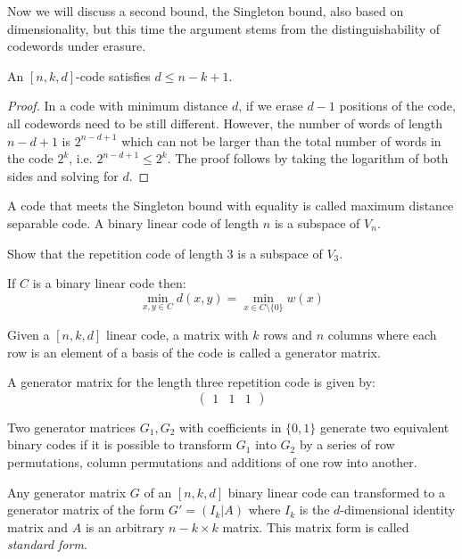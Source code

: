 Now we will discuss a second bound, the Singleton bound, also based on dimensionality, but this time the argument stems from the distinguishability of codewords under erasure.
\begin{theorem}
An $[n,k,d]$-code satisfies $d\leq n-k+1$.
\end{theorem}
\begin{proof}
In a code with minimum distance $d$, if we erase $d-1$ positions of the code, all codewords need to be still different. However, the number of words of length $n-d+1$ is $2^{n-d+1}$ which can not be larger than the total number of words in the code $2^k$, i.e. $2^{n-d+1}\leq2^k$. The proof follows by taking the logarithm of both sides and solving for $d$.
\end{proof}
A code that meets the Singleton bound with equality is called maximum distance separable code.
A binary linear code of length $n$ is a subspace of $V_n$.
\begin{exercise}
Show that the repetition code of length 3 is a subspace of $V_3$.
\end{exercise}
\begin{exercise}
If $C$ is a binary linear code then:
\begin{equation}
\min_{x,y\in C}d(x,y)=\min_{x\in C\setminus\{0\}}w(x)
\end{equation}
\end{exercise}
\begin{definition}
Given a $[n,k,d]$ linear code, a matrix with $k$ rows and $n$ columns where each row is an element of a basis of the code is called a generator matrix.
\end{definition}
\begin{example}
A generator matrix for the length three repetition code is given by:
\begin{equation}
\begin{pmatrix}
1 & 1 & 1
\end{pmatrix}
\end{equation}
\end{example}
\begin{exercise}
Two generator matrices $G_1,G_2$ with coefficients in $\{0,1\}$ generate two equivalent binary codes if it is possible to transform $G_1$ into $G_2$ by a series of row permutations, column permutations and additions of one row into another.
\end{exercise}
\begin{lemma}
Any generator matrix $G$ of an $[n,k,d]$ binary linear code can transformed to a generator matrix of the form $G'=\left(I_k|A\right)$ where $I_k$ is the $d$-dimensional identity matrix and $A$ is an arbitrary $n-k\times k$ matrix. This matrix form is called \textit{standard form}.
\end{lemma}
